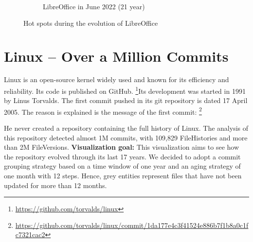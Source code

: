 \begin{figure}[ht]
\begin{subfigure}{0.48\textwidth}
        \caption{LibreOffice in June 2022 (21 year)} 
        \label{fig:Libre_V6_S6}
    \end{subfigure}
    
    \caption{Hot spots during the evolution of LibreOffice} 
    \label{fig:Libre_V6}
\end{figure}


\clearpage
\section{Linux – Over a Million Commits}
Linux is an open-source kernel widely used and known for its efficiency and reliability. Its code is published on GitHub. \footnote{\url{https://github.com/torvalds/linux}}Its development was started in 1991 by Linus Torvalds. The first commit pushed in its git repository is dated 17 April 2005. The reason is explained is the message of the first commit: \footnote{\url{https://github.com/torvalds/linux/commit/1da177e4c3f41524e886b7f1b8a0c1fc7321cac2}}
\begin{displayquote}
\end{displayquote}
He never created a repository containing the full history of Linux. The analysis of this repository detected almost 1M commits, with 109,829 FileHistories and more than 2M FileVersions. 
\newline
\textbf{Visualization goal:}
This visualization aims to see how the repository evolved through its last 17 years. We decided to adopt a commit grouping strategy based on a time window of one year and an aging strategy of one month with 12 steps. Hence, grey entities represent files that have not been updated for more than 12 months. 


